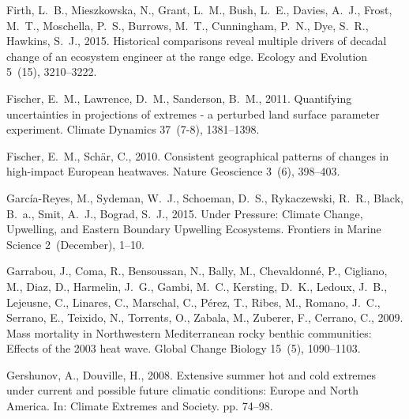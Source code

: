 \documentclass[a4paper,10pt,review]{elsarticle}
\begin{document}
\begin{thebibliography}{52}
Firth, L.~B., Mieszkowska, N., Grant, L.~M., Bush, L.~E., Davies, A.~J., Frost,
  M.~T., Moschella, P.~S., Burrows, M.~T., Cunningham, P.~N., Dye, S.~R.,
  Hawkins, S.~J., 2015. {Historical comparisons reveal multiple drivers of
  decadal change of an ecosystem engineer at the range edge}. Ecology and
  Evolution 5~(15), 3210--3222.

Fischer, E.~M., Lawrence, D.~M., Sanderson, B.~M., 2011. {Quantifying
  uncertainties in projections of extremes - a perturbed land surface parameter
  experiment}. Climate Dynamics 37~(7-8), 1381--1398.

Fischer, E.~M., Sch{\"{a}}r, C., 2010. {Consistent geographical patterns of
  changes in high-impact European heatwaves}. Nature Geoscience 3~(6),
  398--403.

Garc{\'{i}}a-Reyes, M., Sydeman, W.~J., Schoeman, D.~S., Rykaczewski, R.~R.,
  Black, B.~a., Smit, A.~J., Bograd, S.~J., 2015. {Under Pressure: Climate
  Change, Upwelling, and Eastern Boundary Upwelling Ecosystems}. Frontiers in
  Marine Science 2~(December), 1--10.

Garrabou, J., Coma, R., Bensoussan, N., Bally, M., Chevaldonn{\'{e}}, P.,
  Cigliano, M., Diaz, D., Harmelin, J.~G., Gambi, M.~C., Kersting, D.~K.,
  Ledoux, J.~B., Lejeusne, C., Linares, C., Marschal, C., P{\'{e}}rez, T.,
  Ribes, M., Romano, J.~C., Serrano, E., Teixido, N., Torrents, O., Zabala, M.,
  Zuberer, F., Cerrano, C., 2009. {Mass mortality in Northwestern Mediterranean
  rocky benthic communities: Effects of the 2003 heat wave}. Global Change
  Biology 15~(5), 1090--1103.

Gershunov, A., Douville, H., 2008. {Extensive summer hot and cold extremes
  under current and possible future climatic conditions: Europe and North
  America}. In: Climate Extremes and Society. pp. 74--98.


\end{thebibliography}
\end{document}
